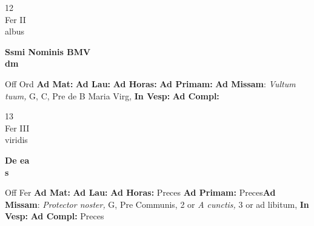 \documentclass[10pt, openany]{book}
\begin{document}
    \begin{center}
        \begin{minipage}{3.5in}
            \vspace{2em}
            \begin{minipage}{0.5in}
                {\Huge 12} \\
                {\normalsize Fer II} \\
                {\normalsize albus}
            \end{minipage}
            \begin{minipage}{3.0in}
                \textbf{ \large Ssmi Nominis BMV \\
                \textnormal{\normalsize dm}} \\ 
            \end{minipage}
            \begin{justify}Off Ord
                \textbf{Ad Mat: }
                \textbf{Ad Lau: }
                \textbf{Ad Horas: }
                \textbf{Ad Primam: }\textbf{Ad Missam}: \textit{Vultum tuum,} G, C, Pre de B Maria Virg,  
                \textbf{In Vesp: }
                \textbf{Ad Compl: }
            \end{justify}
        \end{minipage}
    \end{center}

    \begin{center}
        \begin{minipage}{3.5in}
            \vspace{2em}
            \begin{minipage}{0.5in}
                {\Huge 13} \\
                {\normalsize Fer III} \\
                {\normalsize viridis}
            \end{minipage}
            \begin{minipage}{3.0in}
                \textbf{ \large De ea \\
                \textnormal{\normalsize s}} \\ 
            \end{minipage}
            \begin{justify}Off Fer
                \textbf{Ad Mat: }
                \textbf{Ad Lau: }
                \textbf{Ad Horas: }Preces
                \textbf{Ad Primam: }Preces\textbf{Ad Missam}: \textit{Protector noster,} G, Pre Communis, 2 or \textit{A cunctis,} 3 or ad libitum,  
                \textbf{In Vesp: }
                \textbf{Ad Compl: }Preces
            \end{justify}
        \end{minipage}
    \end{center}
\end{document}
